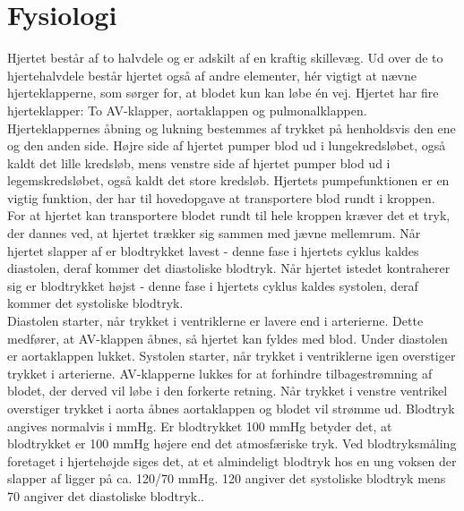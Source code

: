 \section{Fysiologi}
\vspace{0.2 cm}
Hjertet består af to halvdele og er adskilt af en kraftig skillevæg. Ud over de to hjertehalvdele består hjertet også af andre elementer, hér vigtigt at nævne hjerteklapperne, som sørger for, at blodet kun kan løbe én vej. Hjertet har fire hjerteklapper: To AV-klapper, aortaklappen og pulmonalklappen. Hjerteklappernes åbning og lukning bestemmes af trykket på henholdsvis den ene og den anden side. Højre side af hjertet pumper blod ud i lungekredsløbet, også kaldt det lille kredsløb, mens venstre side af hjertet pumper blod ud i legemskredsløbet, også kaldt det store kredsløb. Hjertets pumpefunktionen er en vigtig funktion, der har til hovedopgave at transportere blod rundt i kroppen.\\
\vspace{0.2 cm}
For at hjertet kan transportere blodet rundt til hele kroppen kræver det et tryk, der dannes ved, at hjertet trækker sig sammen med jævne mellemrum. Når hjertet slapper af er blodtrykket lavest - denne fase i hjertets cyklus kaldes diastolen, deraf kommer det diastoliske blodtryk. Når hjertet istedet kontraherer sig er blodtrykket højst - denne fase i hjertets cyklus kaldes systolen, deraf kommer det systoliske blodtryk.\\
\vspace{0.2 cm}
Diastolen starter, når trykket i ventriklerne er lavere end i arterierne. Dette medfører, at AV-klappen åbnes, så hjertet kan fyldes med blod. Under diastolen er aortaklappen lukket.
\vspace{0.2 cm}
Systolen starter, når trykket i ventriklerne igen overstiger trykket i arterierne. AV-klapperne lukkes for at forhindre tilbagestrømning af blodet, der derved vil løbe i den forkerte retning. Når trykket i venstre ventrikel overstiger trykket i aorta åbnes aortaklappen og blodet vil strømme ud. 
\vspace{0.2 cm}
Blodtryk angives normalvis i mmHg. Er blodtrykket 100 mmHg betyder det, at blodtrykket er 100 mmHg højere end det atmosfæriske tryk. Ved blodtryksmåling foretaget i hjertehøjde siges det, at et almindeligt blodtryk hos en ung voksen der slapper af ligger på ca. 120/70 mmHg. 120 angiver det systoliske blodtryk mens 70 angiver det diastoliske blodtryk..